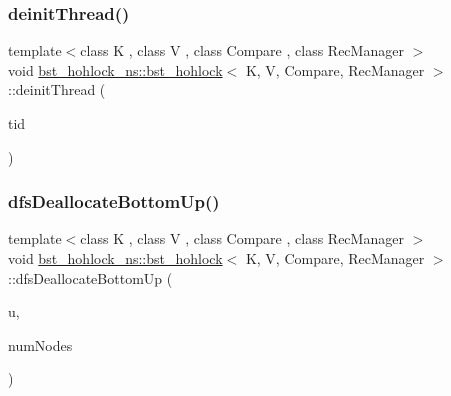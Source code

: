 \mbox{\label{classbst__hohlock__ns_1_1bst__hohlock_a4b7245eaaa163974dcee2e9a9342129d}} 
\subsubsection{\texorpdfstring{deinit\+Thread()}{deinitThread()}}
{\footnotesize\ttfamily template$<$class K , class V , class Compare , class Rec\+Manager $>$ \\
void \hyperlink{classbst__hohlock__ns_1_1bst__hohlock}{bst\+\_\+hohlock\+\_\+ns\+::bst\+\_\+hohlock}$<$ K, V, Compare, Rec\+Manager $>$\+::deinit\+Thread (\begin{DoxyParamCaption}\item[{const int}]{tid }\end{DoxyParamCaption})\hspace{0.3cm}{\ttfamily [inline]}}

\mbox{\label{classbst__hohlock__ns_1_1bst__hohlock_a98f8a385322a6d4640fa67ae0def3180}} 
\subsubsection{\texorpdfstring{dfs\+Deallocate\+Bottom\+Up()}{dfsDeallocateBottomUp()}}
{\footnotesize\ttfamily template$<$class K , class V , class Compare , class Rec\+Manager $>$ \\
void \hyperlink{classbst__hohlock__ns_1_1bst__hohlock}{bst\+\_\+hohlock\+\_\+ns\+::bst\+\_\+hohlock}$<$ K, V, Compare, Rec\+Manager $>$\+::dfs\+Deallocate\+Bottom\+Up (\begin{DoxyParamCaption}\item[{\hyperlink{bst__rwlock__impl_8h_a04158d2a20768fe447133ff555823b05}{nodeptr} const}]{u,  }\item[{int $\ast$}]{num\+Nodes }\end{DoxyParamCaption})\hspace{0.3cm}{\ttfamily [inline]}}

